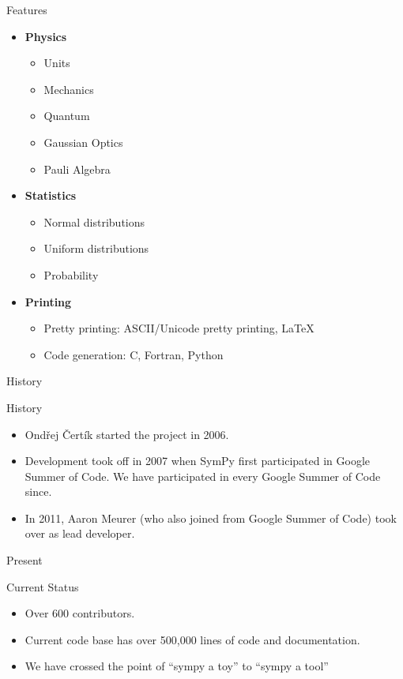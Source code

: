 \documentclass[xcolor=svgnames]{beamer}
\begin{document}
\begin{frame}{Features}
\begin{multicols}{2}
\begin{itemize}
    \item \textbf{Physics}
      \begin{itemize}
        \tiny
      \item Units
      \item Mechanics
      \item Quantum
      \item Gaussian Optics
      \item Pauli Algebra
      \end{itemize}

    \item \textbf{Statistics}
      \begin{itemize}
        \tiny
      \item Normal distributions
      \item Uniform distributions
      \item Probability
      \end{itemize}

    \item \textbf{Printing}
      \begin{itemize}
        \tiny
      \item Pretty printing: ASCII/Unicode pretty printing, LaTeX
      \item Code generation: C, Fortran, Python
      \end{itemize}
    \end{itemize}
  \end{multicols}
\end{frame}

\begin{frame}{History}
  \begin{block}{History}
    \begin{itemize}
    \item Ondřej Čertík started the project in 2006.
    \item Development took off in 2007 when SymPy first participated in Google
      Summer of Code. We have participated in every Google Summer of Code since.
    \item In 2011, Aaron Meurer (who also joined from Google Summer of Code) took
      over as lead developer.
    \end{itemize}
  \end{block}
\end{frame}

\begin{frame}{Present}
  \begin{block}{Current Status}
    \begin{itemize}
    \item Over 600 contributors.
    \item Current code base has over 500,000 lines of code and documentation.
    \item We have crossed the point of ``sympy a toy'' to ``sympy a tool''
    \end{itemize}
  \end{block}
\end{frame}
\end{document}
